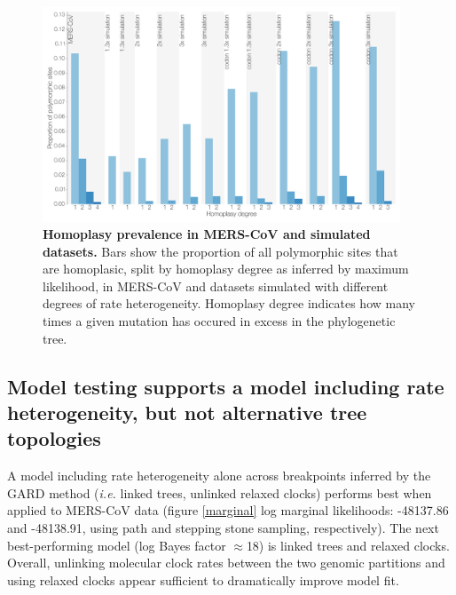\documentclass[11pt,oneside,letterpaper]{article}
\begin{document}
\begin{figure}[h!]
	\centering
	\includegraphics[width=0.95\textwidth]{figures/MERS_homoplasy_control.png}
	\caption{\textbf{Homoplasy prevalence in MERS-CoV and simulated datasets.}
Bars show the proportion of all polymorphic sites that are homoplasic, split by homoplasy degree as inferred by maximum likelihood, in MERS-CoV and datasets simulated with different degrees of rate heterogeneity.
Homoplasy degree indicates how many times a given mutation has occured in excess in the phylogenetic tree.}
	\label{homoplasy_control}
\end{figure}

\subsection*{Model testing supports a model including rate heterogeneity, but not alternative tree topologies}
A model including rate heterogeneity alone across breakpoints inferred by the GARD method (\textit{i.e.} linked trees, unlinked relaxed clocks) performs best when applied to MERS-CoV data (figure \ref{marginal} log marginal likelihoods: -48137.86 and -48138.91, using path and stepping stone sampling, respectively).
The next best-performing model (log Bayes factor $\approx$18) is linked trees and relaxed clocks.
Overall, unlinking molecular clock rates between the two genomic partitions and using relaxed clocks appear sufficient to dramatically improve model fit.
\end{document}
